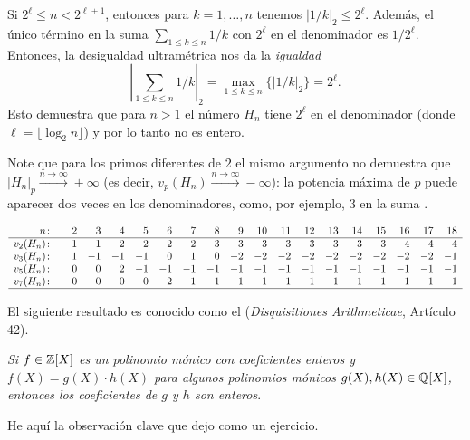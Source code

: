 \documentclass{article}
\numberwithin{equation}{section}
\theoremstyle{definition}
\begin{document}
\begin{aplicacion}
  Si $2^\ell \le n < 2^{\ell+1}$, entonces para $k = 1, \ldots, n$
  tenemos $|1/k|_2 \le 2^\ell$. Además, el único término en la suma
  $\sum_{1\le k\le n} 1/k$ con $2^\ell$ en el denominador
  es $1/2^\ell$. Entonces, la desigualdad ultramétrica nos da la \emph{igualdad}
  $$\left|\sum_{1\le k\le n} 1/k\right|_2 = \max_{1\le k\le n} \{ |1/k|_2 \} = 2^\ell.$$
  Esto demuestra que para $n > 1$ el número $H_n$ tiene $2^\ell$ en
  el denominador (donde $\ell = \lfloor\log_2 n\rfloor$) y por lo tanto
  no es entero.

  Note que para los primos diferentes de $2$ el mismo argumento no demuestra que
  $|H_n|_p \xrightarrow{n\to\infty} +\infty$ (es decir,
  $v_p (H_n) \xrightarrow{n\to\infty} -\infty$): la potencia máxima de $p$ puede
  aparecer dos veces en los denominadores, como, por ejemplo, $3$ en la suma
  .

  \[ \begin{array}{rrrrrrrrrrrrrrrrrr}
       \hline
       n\colon & 2 & 3 & 4 & 5 & 6 & 7 & 8 & 9 & 10 & 11 & 12 & 13 & 14 & 15 & 16 & 17 & 18 \\
       \hline
       v_2 (H_n)\colon & -1 & -1 & -2 & -2 & -2 & -2 & -3 & -3 & -3 & -3 & -3 & -3 & -3 & -3 & -4 & -4 & -4 \\
       v_3 (H_n)\colon & 1 & -1 & -1 & -1 & 0 & 1 & 0 & -2 & -2 & -2 & -2 & -2 & -2 & -2 & -2 & -2 & -1 \\
       v_5 (H_n)\colon & 0 & 0 & 2 & -1 & -1 & -1 & -1 & -1 & -1 & -1 & -1 & -1 & -1 & -1 & -1 & -1 & -1 \\
       v_7 (H_n)\colon & 0 & 0 & 0 & 0 & 2 & -1 & -1 & -1 & -1 & -1 & -1 & -1 & -1 & -1 & -1 & -1 & -1 \\
       \hline
     \end{array} \]
\end{aplicacion}

\begin{aplicacion}
  El siguiente resultado es conocido como el 
  (\emph{Disquisitiones Arithmeticae}, Artículo 42).

  \noindent\emph{Si $f\in \mathbb{Z} [X]$ es un polinomio mónico con coeficientes
    enteros y $f (X) = g (X)\cdot h (X)$ para algunos polinomios mónicos
    $g (X), h (X) \in \mathbb{Q} [X]$, entonces los coeficientes de $g$ y $h$ son
    enteros}.
\end{aplicacion}

He aquí la observación clave que dejo como un ejercicio.
\end{document}
